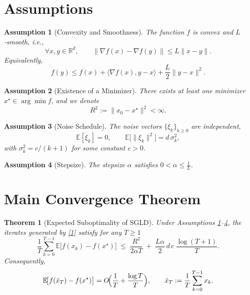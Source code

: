 \documentclass[11pt]{article}
\newtheorem{theorem}{Theorem}
\newtheorem{assumption}{Assumption}
\begin{document}
\newpage

\section*{Assumptions}
\begin{assumption}[Convexity and Smoothness]\label{ass:convex}
The function $f$ is convex and $L$‑smooth, i.e.,
\[
\forall x,y\in\mathbb{R}^d,\qquad 
\|\nabla f(x)-\nabla f(y)\|\le L\|x-y\|.
\tag{A1}
\]
Equivalently,
\[
f(y)\le f(x)+\langle\nabla f(x),y-x\rangle+\frac{L}{2}\|y-x\|^2 .
\tag{A1'}
\]
\end{assumption}

\begin{assumption}[Existence of a Minimizer]\label{ass:min}
There exists at least one minimizer $x^{\star}\in\arg\min f$, and we denote
\[
R^2:=\|x_0-x^{\star}\|^2 <\infty .
\tag{A2}
\]
\end{assumption}

\begin{assumption}[Noise Schedule]\label{ass:noise}
The noise vectors $\{\xi_k\}_{k\ge0}$ are independent,
\[
\mathbb{E}[\xi_k]=0,\qquad 
\mathbb{E}\bigl[\|\xi_k\|^2\bigr]=d\,\sigma_k^{2},
\]
with $\sigma_k^{2}=c/(k+1)$ for some constant $c>0$.
\end{assumption}

\begin{assumption}[Stepsize]\label{ass:step}
The stepsize $\alpha$ satisfies $0<\alpha\le\frac{1}{L}$.
\end{assumption}

\section*{Main Convergence Theorem}
\begin{theorem}[Expected Suboptimality of SGLD]\label{thm:main}
Under Assumptions \ref{ass:convex}–\ref{ass:step}, the iterates generated by
\eqref{1} satisfy for any $T\ge1$
\[
\frac{1}{T}\sum_{k=0}^{T-1}\mathbb{E}\!\bigl[f(x_k)-f(x^{\star})\bigr]
\;\le\;
\frac{R^{2}}{2\alpha T}
\;+\;
\frac{L\alpha}{2}\,d\,c\;\frac{\log (T+1)}{T}.
\tag{2}
\]
Consequently,
\[
\mathbb{E}\!\bigl[f(\bar x_T)-f(x^{\star})\bigr]
=O\!\Bigl(\frac{1}{T}+\frac{\log T}{T}\Bigr),
\qquad 
\bar x_T:=\frac{1}{T}\sum_{k=0}^{T-1}x_k .
\]
\end{theorem}
\end{document}
